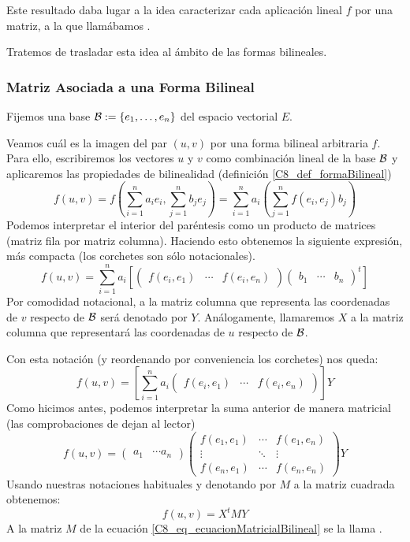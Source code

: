 Este resultado daba lugar a la idea caracterizar cada aplicación lineal $f$ por una matriz, a la que llamábamos .

Tratemos de trasladar esta idea al ámbito de las formas bilineales.
\subsubsection{Matriz Asociada a una Forma Bilineal}
Fijemos una base $\mathcal{B}:=\{e_1,\dots,e_n\}$ del espacio vectorial $E$.

Veamos cuál es la imagen del par $(u,v)$ por una forma bilineal arbitraria $f$. Para ello, escribiremos los vectores $u$ y $v$ como combinación lineal de la base $\mathcal{B}$ y aplicaremos las propiedades de bilinealidad (definición \ref{C8_def_formaBilineal})
\[f(u,v)=f\left(\sum_{i=1}^{n}a_ie_i,\sum_{j=1}^{n}b_je_j\right)=\sum_{i=1}^{n}a_i\left(\sum_{j=1}^{n}f(e_i,e_j)b_j\right)\]
Podemos interpretar el interior del paréntesis como un producto de matrices (matriz fila por matriz columna). Haciendo esto obtenemos la siguiente expresión, más compacta (los corchetes son sólo notacionales).
\[f(u,v)=\sum_{i=1}^{n}a_i\left[\begin{pmatrix}
f(e_i, e_1) & 
\cdots &
f(e_i, e_n)
\end{pmatrix}\begin{pmatrix}
b_1 & \cdots & b_n
\end{pmatrix}^t\right]\]
Por comodidad notacional, a la matriz columna que representa las coordenadas de $v$ respecto de $\mathcal{B}$ será denotado por $Y$. Análogamente, llamaremos $X$ a la matriz columna que representará las coordenadas de $u$ respecto de $\mathcal{B}$.

Con esta notación (y reordenando por conveniencia los corchetes) nos queda:
\[f(u,v)=\left[\sum_{i=1}^{n}a_i\begin{pmatrix}
f(e_i, e_1) & 
\cdots &
f(e_i, e_n)
\end{pmatrix}\right]Y\]
Como hicimos antes, podemos interpretar la suma anterior de manera matricial (las comprobaciones de dejan al lector)
\[f(u,v)=\begin{pmatrix}
a_1 & \cdots a_n
\end{pmatrix}\begin{pmatrix}
f(e_1, e_1) & \cdots & f(e_1,e_n)\\
\vdots & \ddots & \vdots\\
f(e_n,e_1) & \cdots & f(e_n,e_n)
\end{pmatrix}Y\]
Usando nuestras notaciones habituales y denotando por $M$ a la matriz cuadrada obtenemos:
\begin{equation}
\label{C8_eq_ecuacionMatricialBilineal}
f(u,v)=X^tMY
\end{equation}
A la matriz $M$ de la ecuación \eqref{C8_eq_ecuacionMatricialBilineal} se la llama .

